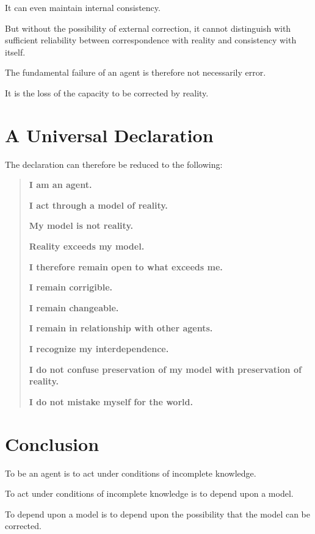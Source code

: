 \documentclass[11pt,a4paper]{article}
\begin{document}
It can even maintain internal consistency.

But without the possibility of external correction, it cannot distinguish
with sufficient reliability between correspondence with reality and
consistency with itself.

The fundamental failure of an agent is therefore not necessarily error.

It is the loss of the capacity to be corrected by reality.


\section{A Universal Declaration}

The declaration can therefore be reduced to the following:

\begin{quote}
\textbf{
I am an agent.
}

\textbf{
I act through a model of reality.
}

\textbf{
My model is not reality.
}

\textbf{
Reality exceeds my model.
}

\textbf{
I therefore remain open to what exceeds me.
}

\textbf{
I remain corrigible.
}

\textbf{
I remain changeable.
}

\textbf{
I remain in relationship with other agents.
}

\textbf{
I recognize my interdependence.
}

\textbf{
I do not confuse preservation of my model with preservation of reality.
}

\textbf{
I do not mistake myself for the world.
}
\end{quote}


\section*{Conclusion}

To be an agent is to act under conditions of incomplete knowledge.

To act under conditions of incomplete knowledge is to depend upon a model.

To depend upon a model is to depend upon the possibility that the model can
be corrected.
\end{document}
